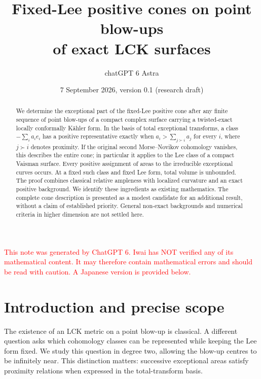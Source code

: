 \documentclass[12pt]{amsart}
\makeatletter
\theoremstyle{definition}
\theoremstyle{remark}
\numberwithin{equation}{section}
\newcommand{\xr}[1]{\textcolor{red}{#1}}
\newcommand{\MergedLanguage}{en}
\let\MergedSetAbstract\@setabstract
\newcommand{\MergedBegin}[1]{%
  \let\@setabstract\MergedSetAbstract
  \def\MergedLanguage{#1}%
  \gdef\authors{}\gdef\shortauthors{}\gdef\addresses{}%
  \gdef\thankses{}%
  \def\tableofcontents{\@starttoc{#1-toc}\contentsname}%
  \setcounter{section}{0}\setcounter{subsection}{0}\setcounter{subsubsection}{0}%
  \setcounter{paragraph}{0}\setcounter{subparagraph}{0}%
  \setcounter{thm}{0}\setcounter{equation}{0}%
  \setcounter{cl}{0}\setcounter{step}{0}\setcounter{case}{0}%
  \setcounter{figure}{0}\setcounter{table}{0}\setcounter{footnote}{0}%
  \renewcommand{\theHsection}{#1.\arabic{section}}%
  \renewcommand{\theHsubsection}{\theHsection.\arabic{subsection}}%
  \renewcommand{\theHsubsubsection}{\theHsubsection.\arabic{subsubsection}}%
  \renewcommand{\theHequation}{#1.\thesection.\arabic{equation}}%
  \def\theHthm{#1.\thesection.\arabic{thm}}%
  \def\theHfigure{#1.\arabic{figure}}%
  \def\theHtable{#1.\arabic{table}}%
  \def\theHfootnote{#1.\arabic{Hfootnote}}%
}
\makeatother
\begin{document}
\begingroup
\MergedBegin{en}
\title[Positive cones on LCK point blow-ups]{Fixed-Lee positive cones on point blow-ups\\of exact LCK surfaces}
\author{chatGPT 6 Astra}







\date{7 September 2026, version 0.1 (research draft)}
\renewcommand{\subjclassname}{\textup{2020} Mathematics Subject Classification}

\begin{abstract}
We determine the exceptional part of the fixed-Lee positive cone after any finite sequence of point blow-ups of a compact complex surface carrying a twisted-exact locally conformally K\"ahler form. In the basis of total exceptional transforms, a class $-\sum_i a_i e_i$ has a positive representative exactly when $a_i>\sum_{j\succ i}a_j$ for every $i$, where $j\succ i$ denotes proximity. If the original second Morse--Novikov cohomology vanishes, this describes the entire cone; in particular it applies to the Lee class of a compact Vaisman surface. Every positive assignment of areas to the irreducible exceptional curves occurs. At a fixed such class and fixed Lee form, total volume is unbounded. The proof combines classical relative ampleness with localized curvature and an exact positive background. We identify these ingredients as existing mathematics. The complete cone description is presented as a modest candidate for an additional result, without a claim of established priority. General non-exact backgrounds and numerical criteria in higher dimension are not settled here.
\end{abstract}
\maketitle
\xr{This note was generated by ChatGPT 6. Iwai has NOT verified any of its mathematical content. It may therefore contain mathematical errors and should be read with caution. A Japanese version is provided below.}
\tableofcontents
\clearpage

\section{Introduction and precise scope}\label{sec:intro}
The existence of an LCK metric on a point blow-up is classical. A different question asks which cohomology classes can be represented while keeping the Lee form fixed. We study this question in degree two, allowing the blow-up centres to be infinitely near. This distinction matters: successive exceptional areas satisfy proximity relations when expressed in the total-transform basis.
\end{document}
